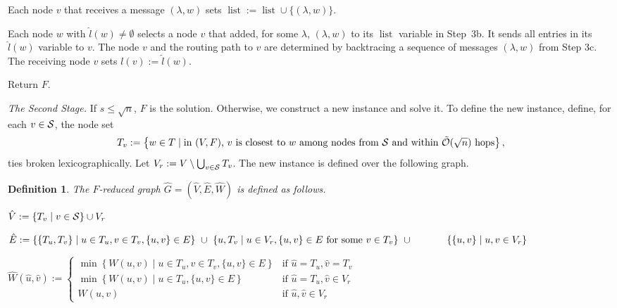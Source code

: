 \documentclass[letterpaper,11pt]{article}
\newtheorem{definition}[theorem]{Definition}
\newcommand{\BO}{\mathcal{O}}
\newcommand{\Comp}{\lambda}
\newcommand{\Set}[1]{\left\{#1\right\}}
\DeclareMathOperator{\unsent}{list}
\begin{document}
\begin{compactenum}
\begin{compactenum}
\begin{compactitem}
      \item Each node $v$ that receives a message $(\Comp,w)$ sets
      $\unsent:=\unsent \cup \{(\Comp,w)\}$.
    \end{compactitem}
    \item Each node $w$ with $\hat{l}(w)\neq \emptyset$ selects a node $v$ that
    added, for some $\Comp$, $(\Comp,w)$ to its $\unsent$ variable in Step~3b.
    It sends all entries in its $\hat{l}(w)$ variable to $v$. The node $v$ and
    the routing path to $v$ are determined by backtracing a sequence of messages
    $(\Comp,w)$ from Step 3c. The receiving node $v$ sets $l(v):=\hat{l}(w)$.
  \end{compactenum}
  \item Return $F$.
\end{compactenum}
\emph{The Second Stage.}
If $s\leq \sqrt{n}$, $F$ is the solution.
Otherwise, we construct a new instance and solve it.
To define the new instance,
define, for each $v\in {\cal
  S}$, the node set
\begin{equation*}
T_v:=\left\{w\in T\mid\mbox{in $(V,F)$, $v$ is closest to $w$
among nodes from ${\cal S}$ and within $\tilde{\BO}(\sqrt{n})$ hops}\right\},
\end{equation*}
 ties  broken lexicographically. Let $V_r:=V\setminus\bigcup_{v\in\cal S}T_v$. 
The new instance is defined over the following graph.

\begin{definition}The
  \emph{$F$-reduced graph} $\hat{G}=(\hat{V},\hat{E},\hat{W})$  is
  defined as
  follows. 
  \begin{compactitem}
  \item $\hat{V}:=\Set{T_v\mid v\in{\cal S}}\cup V_r$
  \item $\hat E
         :=\Set{\{T_u,T_v\}\mid u\in T_u, v\in T_v, \{u,v\}\in E}
         ~\cup~\Set{u,T_v\mid u\in V_r, \{u,v\}\in E\text{ for some }
           v\in T_v}
         ~\cup \\~~~~~~~~~~\Set{\{u,v\}\mid u,v\in V_r}$
  \item $\hat{W}(\hat u,\hat v):=
\begin{cases}\min\Set{W(u,v)\mid u\in T_u, v\in T_v,
      \{u,v\}\in E}& \text{if } \hat u =T_u, \hat v=T_v\\
    \min\Set{W(u,v)\mid u\in T_u,
      \{u,v\}\in E}& \text{if } \hat u =T_u, \hat v\in V_r\\
    W(u,v)&\text{if  } \hat u,\hat v\in V_r
\end{cases}
$
  \end{compactitem}
\end{definition}
\end{document}
